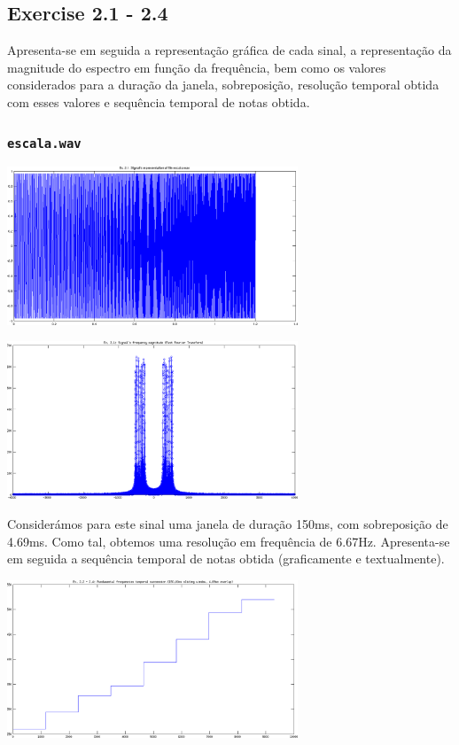 \documentclass[a4paper]{article}
\begin{document}
\subsection{Exercise 2.1 - 2.4}
\indent \indent Apresenta-se em seguida a representação gráfica de cada sinal, a representação da magnitude do espectro em função da frequência, bem como os valores considerados para a duração da janela, sobreposição, resolução temporal obtida com esses valores e sequência temporal de notas obtida.

\subsubsection{\texttt{escala.wav}}
\begin{center}
	\includegraphics[width=0.65\textwidth]{images/ex_2_1_escala_sign.png}
\end{center}
\begin{center}
	\includegraphics[width=0.65\textwidth]{images/ex_2_1_escala_mag.png}
\end{center}

\indent \indent Considerámos para este sinal uma janela de duração 150ms, com sobreposição de 4.69ms. Como tal, obtemos uma resolução em frequência de 6.67Hz. Apresenta-se em seguida a sequência temporal de notas obtida (graficamente e textualmente).
\begin{center}
	\includegraphics[width=0.65\textwidth]{images/ex_2_2_escala.png}
\end{center}
\end{document}
